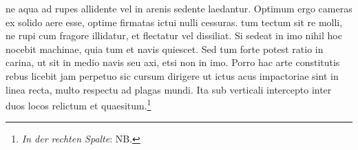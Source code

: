 ne aqua ad rupes allidente vel in arenis sedente laedantur. Optimum ergo cameras ex solido aere esse, optime firmatas ictui nulli cessuras.  tum tectum sit re molli, ne rupi cum fragore illidatur, et flectatur vel dissiliat. Si sedeat in imo nihil hoc nocebit machinae, quia tum et navis\protect{} quiescet. Sed tum  forte potest ratio in carina, ut sit in medio navis\protect{} seu axi, etsi non in imo. Porro hac arte constitutis rebus licebit jam perpetuo sic cursum dirigere ut ictus acus\protect{} impactoriae sint in linea recta, multo respectu ad plagas mundi. Ita  sub verticali intercepto inter duos locos relictum et quaesitum.\footnote{\textit{In der rechten Spalte}: NB.}